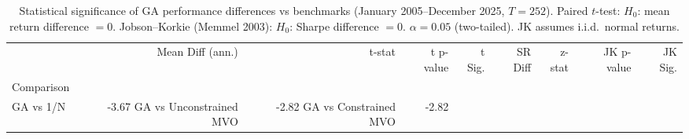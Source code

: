 \begin{table}
\caption{Statistical significance of GA performance differences vs benchmarks (January 2005--December 2025, $T=252$). Paired $t$-test: $H_0$: mean return difference $= 0$. Jobson--Korkie (Memmel 2003): $H_0$: Sharpe difference $= 0$. $\alpha = 0.05$ (two-tailed). JK assumes i.i.d.\ normal returns.}
\label{tab:significance}
\begin{tabular}{lrrrrrrrr}
\toprule
 & Mean Diff (ann.) & t-stat & t p-value & t Sig. & SR Diff & z-stat & JK p-value & JK Sig. \\
Comparison &  &  &  &  &  &  &  &  \\
\midrule
GA vs 1/N & -3.67%
GA vs Unconstrained MVO & -2.82%
GA vs Constrained MVO & -2.82%
\bottomrule
\end{tabular}
\end{table}
